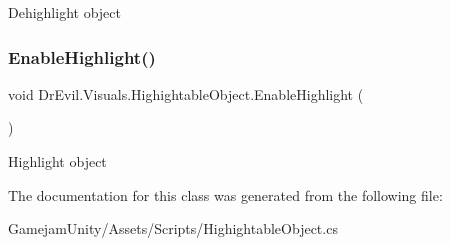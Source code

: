 Dehighlight object 

\mbox{\label{class_dr_evil_1_1_visuals_1_1_highightable_object_aaade7ada66cdac85e38045579c4cb447}} 
\subsubsection{\texorpdfstring{Enable\+Highlight()}{EnableHighlight()}}
{\footnotesize\ttfamily void Dr\+Evil.\+Visuals.\+Highightable\+Object.\+Enable\+Highlight (\begin{DoxyParamCaption}{ }\end{DoxyParamCaption})\hspace{0.3cm}{\ttfamily [inline]}}



Highlight object 



The documentation for this class was generated from the following file\+:\begin{DoxyCompactItemize}
\item 
Gamejam\+Unity/\+Assets/\+Scripts/Highightable\+Object.\+cs\end{DoxyCompactItemize}
